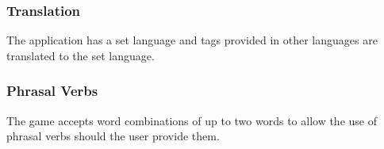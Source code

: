 \subsubsection{Translation}
\label{gacomphs19:sec:concepts:linguistics:translation}
The application has a set language and tags provided in other languages are translated to the set language.


\subsubsection{Phrasal Verbs}
\label{gacomphs19:sec:concepts:linguistics:phraselverbs}
The game accepts word combinations of up to two words to allow the use of phrasal verbs should the user provide them.


